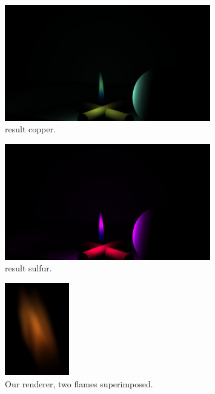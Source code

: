 \begin{figure}[htbp!]
	\centering
	\includegraphics[width=0.8\textwidth, trim={8cm 0 8cm 10cm}, clip]{img/result_copper}
	\caption{result copper.}
	\label{fig:result_copper}
\end{figure}

\begin{figure}[htbp!]
	\centering
	\includegraphics[width=0.8\textwidth, trim={8cm 0 8cm 10cm}, clip]{img/result_sulfur}
	\caption{result sulfur.}
	\label{fig:result_sulfur}
\end{figure}

\begin{figure}[htbp!]
	\centering
	\includegraphics[width=0.25\textwidth]{img/result_synthetic}
	\caption{Our renderer, two flames superimposed.}
	\label{fig:result_synthetic}
\end{figure}